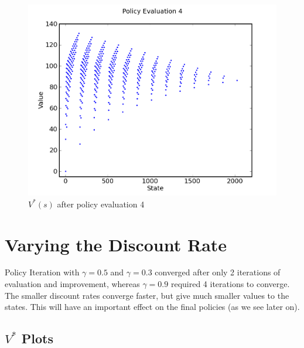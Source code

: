 \documentclass[a4paper]{article}
\begin{document}
\begin{figure}[h]
\center
\includegraphics[scale=0.8]{policy_iteration/evaluation_4.png}
\caption{$V^*(s)$ after policy evaluation 4}
\end{figure}


\clearpage

\section{Varying the Discount Rate}

Policy Iteration with $\gamma = 0.5$ and $\gamma = 0.3$ converged after only 2 iterations of evaluation and improvement, whereas $\gamma = 0.9$ required 4 iterations to converge.
The smaller discount rates converge faster, but give much smaller values to the states.  This will have an important effect on the final policies (as we see later on).

\subsection{$V^*$ Plots}

\end{document}
